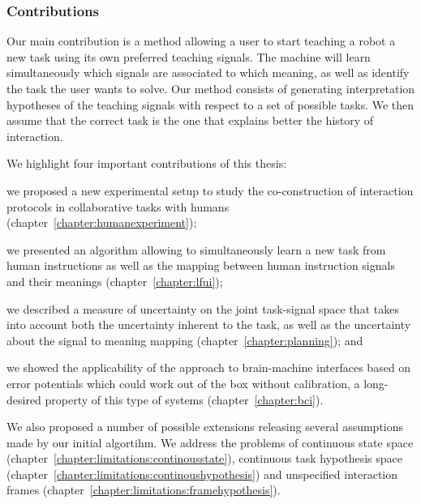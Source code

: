 \subsubsection*{Contributions}

Our main contribution is a method allowing a user to start teaching a robot a new task using its own preferred teaching signals. The machine will learn simultaneously which signals are associated to which meaning, as well as identify the task the user wants to solve. Our method consists of generating interpretation hypotheses of the teaching signals with respect to a set of possible tasks. We then assume that the correct task is the one that explains better the history of interaction.

We highlight four important contributions of this thesis: \begin{inparaenum}[(1)] \item we proposed a new experimental setup to study the co-construction of interaction protocols in collaborative tasks with humans (chapter~\ref{chapter:humanexperiment}); \item we presented an algorithm allowing to simultaneously learn a new task from human instructions as well as the mapping between human instruction signals and their meanings (chapter~\ref{chapter:lfui}); \item we described a measure of uncertainty on the joint task-signal space that takes into account both the uncertainty inherent to the task, as well as the uncertainty about the signal to meaning mapping (chapter~\ref{chapter:planning}); and \item we showed the applicability of the approach to brain-machine interfaces based on error potentials which could work out of the box without calibration, a long-desired property of this type of systems (chapter~\ref{chapter:bci}). \end{inparaenum}

We also proposed a number of possible extensions releasing several assumptions made by our initial algortihm. We address the problems of continuous state space (chapter~\ref{chapter:limitations:continousstate}), continuous task hypothesis space (chapter~\ref{chapter:limitations:continoushypothesis}) and unspecified interaction frames (chapter~\ref{chapter:limitations:framehypothesis}). 


